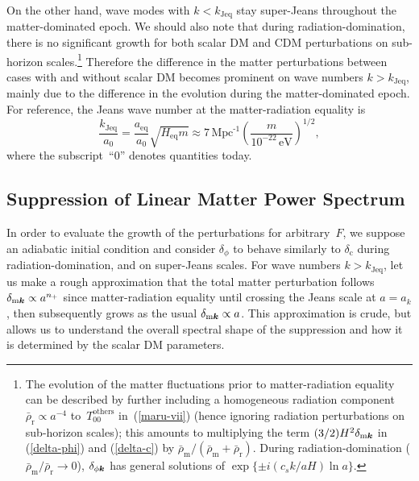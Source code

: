 \documentclass[11pt,nofootinbib]{article}
\numberwithin{equation}{section}
\begin{document}
On the other hand, wave modes with $ k < k_{\mathrm{Jeq}}$ stay super-Jeans
throughout the matter-dominated epoch.
We should also note that during radiation-domination, there is no
significant growth for both scalar DM and CDM perturbations on
sub-horizon scales.\footnote{The evolution of 
the matter fluctuations prior to matter-radiation equality
can be described by further including a homogeneous radiation component
$\bar{\rho}_\mathrm{r} \propto a^{-4}$
to~$T_{00}^{\mathrm{others}}$ in~(\ref{maru-vii})
(hence ignoring radiation perturbations on sub-horizon scales);
this amounts to multiplying
the term $(3/2) H^2 \delta_{\mathrm{m}\boldsymbol{k}}$
in (\ref{delta-phi}) and (\ref{delta-c}) by 
$\bar{\rho}_\mathrm{m} / ( \bar{\rho}_\mathrm{m} +
\bar{\rho}_\mathrm{r})$. During radiation-domination
($\bar{\rho}_\mathrm{m} / \bar{\rho}_\mathrm{r} \to 0$),
$\delta_{\phi \boldsymbol{k}} $ has general solutions of 
$\exp \{\pm i (c_s k / a H) \ln a \} $.\label{foot:RD}}
Therefore the difference in the matter perturbations between cases
with and without scalar DM becomes prominent
on wave numbers $k > k_{\mathrm{Jeq}}$,
mainly due to the difference in the evolution during the matter-dominated epoch.
For reference, the Jeans wave number at the matter-radiation equality is
\begin{equation}
 \frac{k_{\mathrm{J eq}}}{a_0}
=  \frac{a_\mathrm{eq}}{a_0}  \sqrt{H_{\mathrm{eq}} m}
\approx 7  \, \mathrm{Mpc}^{\text{-}1}
  \left( \frac{m}{10^{-22} \, \mathrm{eV}} \right)^{1/2},
  \label{kJ_eq}
\end{equation}
where the subscript~``$0$'' denotes quantities today.


\subsection{Suppression of Linear Matter Power Spectrum}
\label{ap:suppression}

In order to evaluate the growth of the perturbations for arbitrary~$F$,
we suppose an adiabatic initial condition and consider
$\delta_\phi$ to behave similarly to $\delta_{\mathrm{c}}$
during radiation-domination, and on super-Jeans scales.
For wave numbers $ k > k_{\mathrm{Jeq}}$, let us make a rough approximation that 
the total matter perturbation follows $\delta_{\mathrm{m}\boldsymbol{k}} \propto a^{n_+}$
since matter-radiation equality until crossing the Jeans scale at $a = a_k$,
then subsequently grows as the usual $\delta_{\mathrm{m}\boldsymbol{k}} \propto a$.
This approximation is crude, but allows us to understand the overall spectral
shape of the suppression and how it is determined by the scalar DM
parameters.
\end{document}
